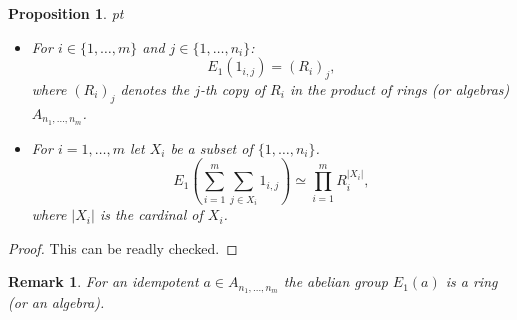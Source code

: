 \documentclass[12pt, reqno]{amsart}
\newtheorem{proposition}[theorem]{Proposition}
\newtheorem{remark}[theorem]{Remark}
\begin{document}
\begin{proposition}\label{E1} \quad
{} pt
\begin{itemize}
\item[1)] For $i \in \{1,\dots,m\}$ and $j\in \{1,\dots,n_i\}$: $$E_1(1_{i,j})=(R_i)_j,$$ where $(R_i)_j$ denotes the $j$-th copy of $R_i$ in the product of rings (or algebras) $A_{n_1,\dots,n_m}$.\\
\item[2)] For $i=1,\dots,m$ let $X_i$ be a subset of $\{1,\dots,n_i\}$. $$E_1(\overset{m}{\underset{i=1}{\sum}} \underset{j\in X_i}{\sum} 1_{i,j}) \simeq \overset{m}{\underset{i=1}{\prod}} R_i^{\vert X_i\vert},$$ where $\vert X_i\vert$ is the cardinal of $X_i$. 
\end{itemize}
\end{proposition}
\begin{proof}
This can be readly checked.
\end{proof}

\begin{remark}
For an idempotent $a\in A_{n_1,\dots,n_m}$ the abelian group $E_1(a)$ is a ring (or an algebra).
\end{remark}
 
\end{document}
